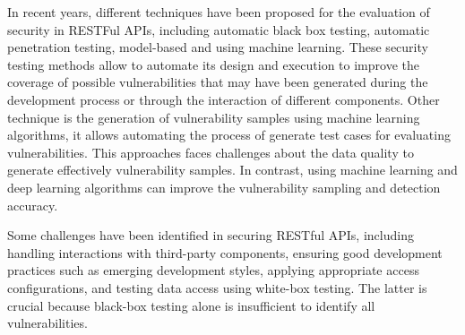 In recent years, different techniques have been proposed for the evaluation of security in RESTFul APIs, including automatic black box testing\cite{Corradini2023}, automatic penetration testing\cite{Auricchio2022}, model-based\cite{EMEKA2023} and using machine learning\cite{Ghanem2019,Hu2020,Schwartz2019}. These security testing methods allow to automate its design and execution to improve the coverage of possible vulnerabilities that may have been generated during the development process or through the interaction of different components. Other technique is the generation of vulnerability samples using machine learning algorithms\cite{Nong2022GeneratingRV}, it allows automating the process of generate test cases for evaluating vulnerabilities. This approaches faces challenges about the data quality to generate effectively vulnerability samples. In contrast, using machine learning and deep learning algorithms can improve the vulnerability sampling and detection accuracy.

Some challenges have been identified in securing RESTful APIs\cite{zhong2023}, including handling interactions with third-party components, ensuring good development practices such as emerging development styles, applying appropriate access configurations, and testing data access using white-box testing. The latter is crucial because black-box testing alone is insufficient to identify all vulnerabilities.
